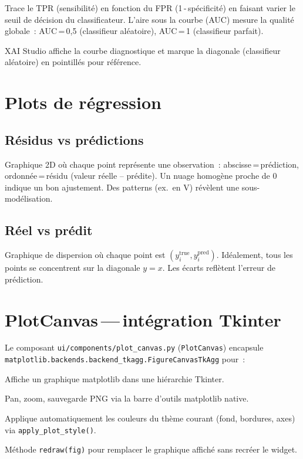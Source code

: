 \documentclass[11pt,a4paper]{report}
\begin{document}
Trace le TPR (sensibilit\'e) en fonction du FPR (1\,-\,sp\'ecificit\'e) en
faisant varier le seuil de d\'ecision du classificateur. L'aire sous
la courbe (AUC) mesure la qualit\'e globale~: AUC\,=\,0,5 (classifieur
al\'eatoire), AUC\,=\,1 (classifieur parfait).

XAI Studio affiche la courbe diagnostique et marque la diagonale
(classifieur al\'eatoire) en pointill\'es pour r\'ef\'erence.

\section{Plots de r\'egression}

\subsection{R\'esidus vs pr\'edictions}

Graphique 2D o\`u chaque point repr\'esente une observation~:
abscisse\,=\,pr\'ediction, ordonn\'ee\,=\,r\'esidu (valeur r\'eelle -- pr\'edite).
Un nuage homog\`ene proche de 0 indique un bon ajustement. Des
patterns (ex.\ en V) r\'ev\`elent une sous-mod\'elisation.

\subsection{R\'eel vs pr\'edit}

Graphique de dispersion o\`u chaque point est $(y_i^{\text{true}}, y_i^{\text{pred}})$.
Id\'ealement, tous les points se concentrent sur la diagonale $y=x$.
Les \'ecarts refl\`etent l'erreur de pr\'ediction.

\section{PlotCanvas\,---\,int\'egration Tkinter}

Le composant \texttt{ui/components/plot\_canvas.py} (\texttt{PlotCanvas})
encapsule \texttt{matplotlib.backends.backend\_tkagg.FigureCanvasTkAgg}
pour~:

\begin{description}[font=\sffamily\bfseries\color{accent}]
    \item[Rendu natif]
        Affiche un graphique matplotlib dans une hi\'erarchie Tkinter.
    \item[Interactions]
        Pan, zoom, sauvegarde PNG via la barre d'outils matplotlib
        native.
    \item[Th\'eming]
        Applique automatiquement les couleurs du th\`eme courant
        (fond, bordures, axes) via \texttt{apply\_plot\_style()}.
    \item[Redraw]
        M\'ethode \texttt{redraw(fig)} pour remplacer le graphique affich\'e
        sans recr\'eer le widget.
\end{description}
\end{document}
